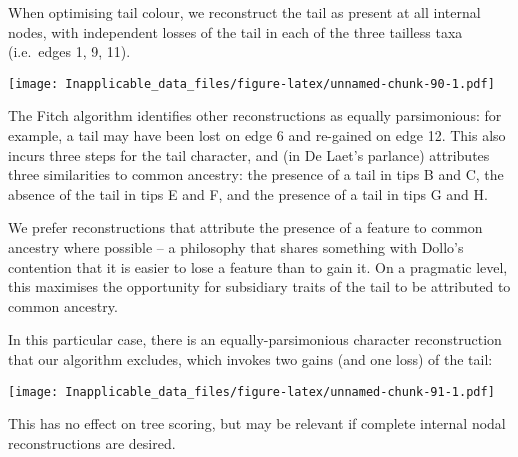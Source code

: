 \documentclass[]{book}
\theoremstyle{definition}
\theoremstyle{definition}
\theoremstyle{definition}
\theoremstyle{remark}
\begin{document}
When optimising tail colour, we reconstruct the tail as present at all
internal nodes, with independent losses of the tail in each of the three
tailless taxa (i.e.~edges 1, 9, 11).

\texttt{[image: Inapplicable\_data\_files/figure-latex/unnamed-chunk-90-1.pdf]}

The Fitch algorithm identifies other reconstructions as equally
parsimonious: for example, a tail may have been lost on edge 6 and
re-gained on edge 12. This also incurs three steps for the tail
character, and (in De Laet's parlance) attributes three similarities to
common ancestry: the presence of a tail in tips B and C, the absence of
the tail in tips E and F, and the presence of a tail in tips G and H.

We prefer reconstructions that attribute the presence of a feature to
common ancestry where possible -- a philosophy that shares something
with Dollo's contention that it is easier to lose a feature than to gain
it. On a pragmatic level, this maximises the opportunity for subsidiary
traits of the tail to be attributed to common ancestry.

In this particular case, there is an equally-parsimonious character
reconstruction that our algorithm excludes, which invokes two gains (and
one loss) of the tail:

\texttt{[image: Inapplicable\_data\_files/figure-latex/unnamed-chunk-91-1.pdf]}

This has no effect on tree scoring, but may be relevant if complete
internal nodal reconstructions are desired.


\end{document}
